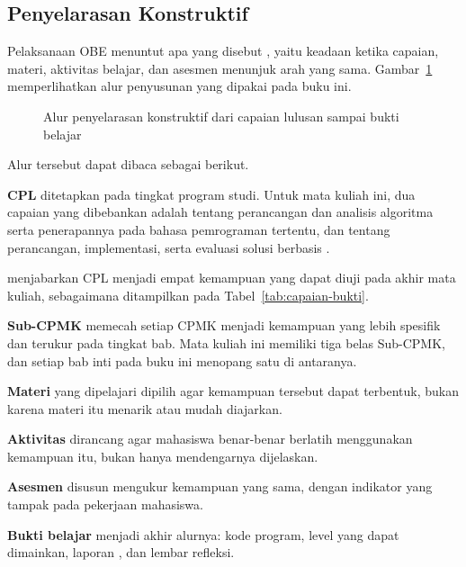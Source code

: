 \subsection{Penyelarasan Konstruktif}

Pelaksanaan OBE menuntut apa yang disebut ,
yaitu keadaan ketika capaian, materi, aktivitas belajar, dan asesmen menunjuk
arah yang sama. Gambar~\ref{fig:alur-obe} memperlihatkan alur penyusunan
yang dipakai pada buku ini.

\begin{figure}[htbp]
\centering

\caption{Alur penyelarasan konstruktif dari capaian lulusan sampai bukti belajar}
\label{fig:alur-obe}
\end{figure}

Alur tersebut dapat dibaca sebagai berikut.

\begin{langkah}
  \item \textbf{CPL} ditetapkan pada tingkat program studi. Untuk mata kuliah
        ini, dua capaian yang dibebankan adalah  tentang perancangan
        dan analisis algoritma serta penerapannya pada bahasa pemrograman
        tertentu, dan  tentang perancangan, implementasi, serta
        evaluasi solusi berbasis .
  \item \textbf{\CPMK} menjabarkan CPL menjadi empat kemampuan yang dapat
        diuji pada akhir mata kuliah, sebagaimana ditampilkan pada
        Tabel~\ref{tab:capaian-bukti}.
  \item \textbf{Sub-CPMK} memecah setiap CPMK menjadi kemampuan yang lebih
        spesifik dan terukur pada tingkat bab. Mata kuliah ini memiliki
        tiga belas Sub-CPMK, dan setiap bab inti pada buku ini menopang satu
        di antaranya.
  \item \textbf{Materi} yang dipelajari dipilih agar kemampuan tersebut dapat
        terbentuk, bukan karena materi itu menarik atau mudah diajarkan.
  \item \textbf{Aktivitas} dirancang agar mahasiswa benar-benar berlatih
        menggunakan kemampuan itu, bukan hanya mendengarnya dijelaskan.
  \item \textbf{Asesmen} disusun mengukur kemampuan yang sama, dengan
        indikator yang tampak pada pekerjaan mahasiswa.
  \item \textbf{Bukti belajar} menjadi akhir alurnya: kode program, level
        yang dapat dimainkan, laporan , dan lembar refleksi.
\end{langkah}

